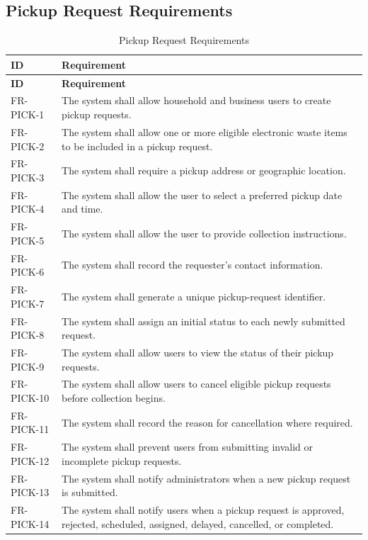 \subsection{Pickup Request Requirements}
\begin{longtable}{@{}p{2.4cm}p{11cm}@{}}
\caption{Pickup Request Requirements} \label{tab:fr-pick} \\
\toprule \textbf{ID} & \textbf{Requirement} \\ \midrule
\endfirsthead
\toprule \textbf{ID} & \textbf{Requirement} \\ \midrule
\endhead
FR-PICK-1 & The system shall allow household and business users to create pickup requests. \\
FR-PICK-2 & The system shall allow one or more eligible electronic waste items to be included in a pickup request. \\
FR-PICK-3 & The system shall require a pickup address or geographic location. \\
FR-PICK-4 & The system shall allow the user to select a preferred pickup date and time. \\
FR-PICK-5 & The system shall allow the user to provide collection instructions. \\
FR-PICK-6 & The system shall record the requester's contact information. \\
FR-PICK-7 & The system shall generate a unique pickup-request identifier. \\
FR-PICK-8 & The system shall assign an initial status to each newly submitted request. \\
FR-PICK-9 & The system shall allow users to view the status of their pickup requests. \\
FR-PICK-10 & The system shall allow users to cancel eligible pickup requests before collection begins. \\
FR-PICK-11 & The system shall record the reason for cancellation where required. \\
FR-PICK-12 & The system shall prevent users from submitting invalid or incomplete pickup requests. \\
FR-PICK-13 & The system shall notify administrators when a new pickup request is submitted. \\
FR-PICK-14 & The system shall notify users when a pickup request is approved, rejected, scheduled, assigned, delayed, cancelled, or completed. \\
\bottomrule
\end{longtable}

